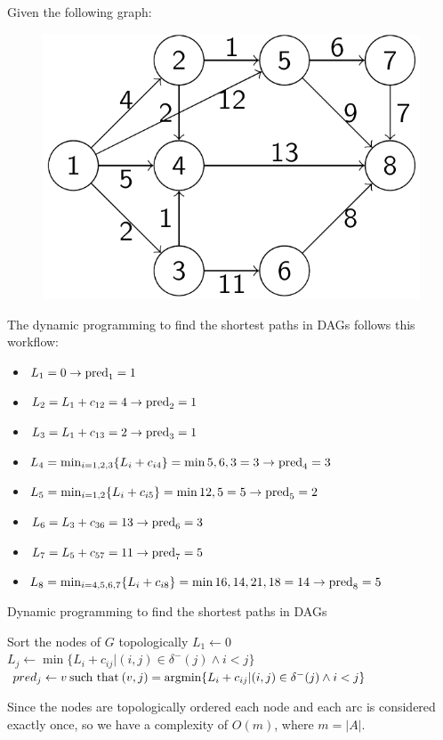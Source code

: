 \documentclass[12pt, a4paper]{report}
\begin{document}
    \begin{example}
        Given the following graph: 
        \begin{figure}[H]
            \centering
            \includegraphics[width=0.4\linewidth]{images/DAG.png}
        \end{figure}
        The dynamic programming to find the shortest paths in DAGs follows this workflow: 
        \begin{itemize}
            \item $L_1=0 \rightarrow \textnormal{pred}_1=1$
            \item $L_2=L_1+c_{12}=4 \rightarrow \textnormal{pred}_2=1$
            \item $L_3=L_1+c_{13}=2 \rightarrow \textnormal{pred}_3=1$
            \item $L_4=\min_{i=1,2,3}\{L_i+c_{i4}\}=\min{5,6,3}=3 \rightarrow \textnormal{pred}_4=3$
            \item $L_5=\min_{i=1,2}\{L_i+c_{i5}\}=\min{12,5}=5 \rightarrow \textnormal{pred}_5=2$
            \item $L_6=L_3+c_{36}=13 \rightarrow \textnormal{pred}_6=3$
            \item $L_7=L_5+c_{57}=11 \rightarrow \textnormal{pred}_7=5$
            \item $L_8=\min_{i=4,5,6,7}\{L_i+c_{i8}\}=\min{16,14,21,18}=14 \rightarrow \textnormal{pred}_8=5$
        \end{itemize}
    \end{example}
    \begin{algorithm}[H]
        \caption{Dynamic programming to find the shortest paths in DAGs}
            \begin{algorithmic}[1]
                \State Sort the nodes of $G$ topologically
                \State $L_1 \leftarrow 0$
                    \State $L_j \leftarrow \min\{L_i+c_{ij}|(i,j) \in \delta^{-}(j) \land i < j\}$
                    \State $pred_j \leftarrow v \: \textnormal{such that} \: (v,j)=\textnormal{argmin} \{L_i+c_{ij}|(i,j) \in \delta^{-}(j) \land i < j\}$
                \EndFor
            \end{algorithmic}
    \end{algorithm}
    Since the nodes are topologically ordered each node and each arc is considered exactly once, so we have a complexity of $O(m)$, where $m=\left\lvert A \right\rvert$. 
    
\end{document}
